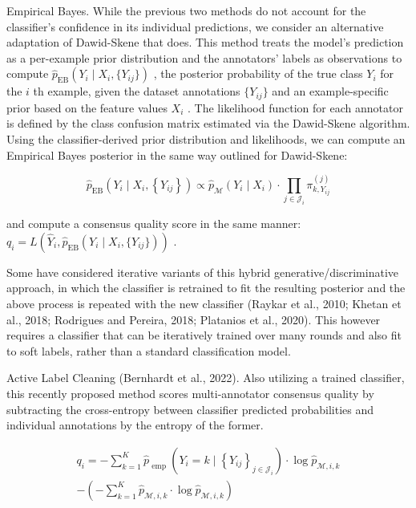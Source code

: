 \documentclass[
]{article}
\begin{document}
Empirical Bayes. While the previous two methods do not account for the
classifier's confidence in its individual predictions, we consider an
alternative adaptation of Dawid-Skene that does. This method treats the
model's prediction as a per-example prior distribution and the
annotators' labels as observations to compute
\(\widehat{p}_{\mathrm{EB}}(Y_i \mid X_i, \{Y_{ij}\})\) , the posterior
probability of the true class \(Y_i\) for the \(i\) th example, given
the dataset annotations \(\{Y_{ij}\}\) and an example-specific prior
based on the feature values \(X_i\) . The likelihood function for each
annotator is defined by the class confusion matrix estimated via the
Dawid-Skene algorithm. Using the classifier-derived prior distribution
and likelihoods, we can compute an Empirical Bayes posterior in the same
way outlined for Dawid-Skene:

\[
\widehat {p} _ {\mathrm{EB}} \left(Y _ {i} \mid X _ {i}, \left\{Y _ {i j} \right\}\right) \propto \widehat {p} _ {\mathcal {M}} \left(Y _ {i} \mid X _ {i}\right) \cdot \prod_ {j \in \mathcal {J} _ {i}} \pi_ {k, Y _ {i j}} ^ {(j)} \tag {17}
\]

and compute a consensus quality score in the same manner:
\(q_{i} = L(\hat{Y}_{i}, \hat{p}_{\mathrm{EB}}(Y_{i} \mid X_{i}, \{Y_{ij}\}))\)
.

Some have considered iterative variants of this hybrid
generative/discriminative approach, in which the classifier is retrained
to fit the resulting posterior and the above process is repeated with
the new classifier (Raykar et al., 2010; Khetan et al., 2018; Rodrigues
and Pereira, 2018; Platanios et al., 2020). This however requires a
classifier that can be iteratively trained over many rounds and also fit
to soft labels, rather than a standard classification model.

Active Label Cleaning (Bernhardt et al., 2022). Also utilizing a trained
classifier, this recently proposed method scores multi-annotator
consensus quality by subtracting the cross-entropy between classifier
predicted probabilities and individual annotations by the entropy of the
former.

\[
\begin{array}{l} q _ {i} = - \sum_ {k = 1} ^ {K} \widehat {p} _ {\text { emp }} \left(Y _ {i} = k \mid \left\{Y _ {i j} \right\} _ {j \in \mathcal {J} _ {i}}\right) \cdot \log \widehat {p} _ {\mathcal {M}, i, k} \\ - \left(- \sum_ {k = 1} ^ {K} \hat {p} _ {\mathcal {M}, i, k} \cdot \log \hat {p} _ {\mathcal {M}, i, k}\right) \tag {18} \\ \end{array}
\]
\end{document}

